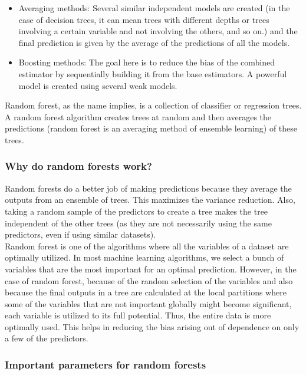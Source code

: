 \documentclass{article}
\numberwithin{equation}{section} %
\begin{document}
\begin{itemize}
	\item Averaging methods: Several similar independent models are created (in
	the case of decision trees, it can mean trees with different depths or trees
	involving a certain variable and not involving the others, and so on.) and the
	final prediction is given by the average of the predictions of all the models.
	\item Boosting methods: The goal here is to reduce the bias of the combined
	estimator by sequentially building it from the base estimators. A powerful
	model is created using several weak models.
\end{itemize}

Random forest, as the name implies, is a collection of classifier or regression trees. A random forest algorithm creates trees at random and then averages the predictions (random forest is an averaging method of ensemble learning) of these trees.


\subsubsection*{Why do random forests work?}

Random forests do a better job of making predictions because they average the
outputs from an ensemble of trees. This maximizes the variance reduction. Also,
taking a random sample of the predictors to create a tree makes the tree independent
of the other trees (as they are not necessarily using the same predictors, even if using similar datasets). \\

Random forest is one of the algorithms where all the variables of a dataset are
optimally utilized. In most machine learning algorithms, we select a bunch of
variables that are the most important for an optimal prediction. However, in the case of random forest, because of the random selection of the variables and also because the final outputs in a tree are calculated at the local partitions where some of the variables that are not important globally might become significant, each variable is utilized to its full potential. Thus, the entire data is more optimally used. This helps in reducing the bias arising out of dependence on only a few of the predictors.


\subsubsection{Important parameters for random forests}
\end{document}
